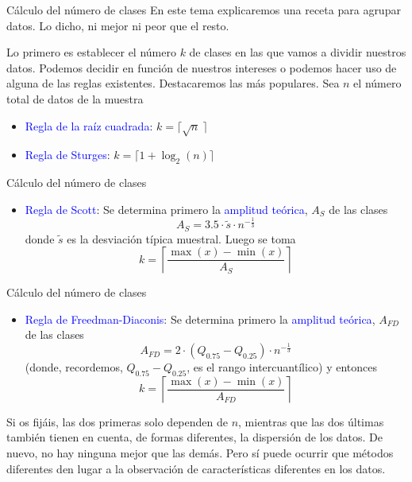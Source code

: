 \documentclass[
  ignorenonframetext,
  aspectratio=169]{beamer}
\providecommand{\tightlist}{%
  \setlength{\itemsep}{0pt}\setlength{\parskip}{0pt}}
\newcommand\blue[1]{\textcolor{blue}{#1}}
\begin{document}
\begin{frame}{Cálculo del número de clases}
\label{cuxe1lculo-del-nuxfamero-de-clases}
En este tema explicaremos una receta para agrupar datos. Lo dicho, ni
mejor ni peor que el resto.

Lo primero es establecer el número \(k\) de clases en las que vamos a
dividir nuestros datos. Podemos decidir en función de nuestros intereses
o podemos hacer uso de alguna de las reglas existentes. Destacaremos las
más populares. Sea \(n\) el número total de datos de la muestra

\begin{itemize}
\tightlist
\item
  \blue{Regla de la raíz cuadrada}: \(k = \lceil\sqrt{n}\ \rceil\)
\item
  \blue{Regla de Sturges}: \(k = \lceil 1+\log_{2}(n)\rceil\)
\end{itemize}
\end{frame}

\begin{frame}{Cálculo del número de clases}
\label{cuxe1lculo-del-nuxfamero-de-clases-1}
\begin{itemize}
\tightlist
\item
  \blue{Regla de Scott}: Se determina primero la
  \blue{amplitud teórica}, \(A_S\) de las clases
  \[A_S = 3.5\cdot\tilde{s}\cdot n^{-\frac{1}{3}}\] donde \(\tilde{s}\)
  es la desviación típica muestral. Luego se toma
  \[k = \left\lceil \frac{\max(x)-\min(x)}{A_S}\right\rceil\]
\end{itemize}
\end{frame}

\begin{frame}{Cálculo del número de clases}
\label{cuxe1lculo-del-nuxfamero-de-clases-2}
\begin{itemize}
\tightlist
\item
  \blue{Regla de Freedman-Diaconis}: Se determina primero la
  \blue{amplitud teórica}, \(A_{FD}\) de las clases
  \[A_{FD} = 2\cdot(Q_{0.75}-Q_{0.25})\cdot n^{-\frac{1}{3}}\] (donde,
  recordemos, \(Q_{0.75}-Q_{0.25}\), es el rango intercuantílico) y
  entonces
  \[k = \left\lceil \frac{\max(x)-\min(x)}{A_{FD}}\right\rceil\]
\end{itemize}

Si os fijáis, las dos primeras solo dependen de \(n\), mientras que las
dos últimas también tienen en cuenta, de formas diferentes, la
dispersión de los datos. De nuevo, no hay ninguna mejor que las demás.
Pero sí puede ocurrir que métodos diferentes den lugar a la observación
de características diferentes en los datos.
\end{frame}
\end{document}
